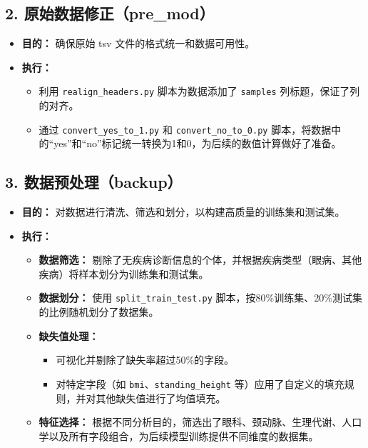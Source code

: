\documentclass[UTF8]{report}
\theoremstyle{MyLineTheoremStyle} %
\theoremstyle{MyBlockTheoremStyle} %
\theoremstyle{MySubsubsectionStyle} %
\begin{document}
\subsection*{2. 原始数据修正（pre\_mod）}
\begin{itemize}
    \item \textbf{目的：} 确保原始 tsv 文件的格式统一和数据可用性。
    \item \textbf{执行：}
    \begin{itemize}
        \item 利用 \texttt{realign\_headers.py} 脚本为数据添加了 \texttt{samples} 列标题，保证了列的对齐。
        \item 通过 \texttt{convert\_yes\_to\_1.py} 和 \texttt{convert\_no\_to\_0.py} 脚本，将数据中的“yes”和“no”标记统一转换为1和0，为后续的数值计算做好了准备。
    \end{itemize}
\end{itemize}

\subsection*{3. 数据预处理（backup）}
\begin{itemize}
    \item \textbf{目的：} 对数据进行清洗、筛选和划分，以构建高质量的训练集和测试集。
    \item \textbf{执行：}
    \begin{itemize}
        \item \textbf{数据筛选：} 剔除了无疾病诊断信息的个体，并根据疾病类型（眼病、其他疾病）将样本划分为训练集和测试集。
        \item \textbf{数据划分：} 使用 \texttt{split\_train\_test.py} 脚本，按80\%训练集、20\%测试集的比例随机划分了数据集。
        \item \textbf{缺失值处理：}
        \begin{itemize}
            \item 可视化并剔除了缺失率超过50\%的字段。
            \item 对特定字段（如 \texttt{bmi}、\texttt{standing\_height} 等）应用了自定义的填充规则，并对其他缺失值进行了均值填充。
        \end{itemize}
        \item \textbf{特征选择：} 根据不同分析目的，筛选出了眼科、颈动脉、生理代谢、人口学以及所有字段组合，为后续模型训练提供不同维度的数据集。
    \end{itemize}
\end{itemize}
\end{document}
